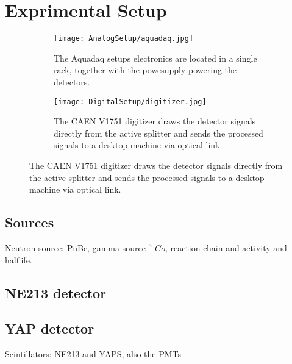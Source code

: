 \documentclass[main.tex]{subfiles}
\begin{document}
\section{Exprimental Setup}
\begin{figure}[ht]
	\begin{subfigure}[b]{0.4\textwidth}
	    \centering
    	    \texttt{[image: AnalogSetup/aquadaq.jpg]}
        	\caption{The Aquadaq setups electronics are located in a single rack, together with the powesupply powering the detectors.}
	    \label{fig:aquadaq_image} 
	\end{subfigure}
	\begin{subfigure}[b]{0.4\textwidth}
    	\centering
        	\texttt{[image: DigitalSetup/digitizer.jpg]}
        	\caption{The CAEN V1751 digitizer draws the detector signals directly from the active splitter and sends the processed signals to a desktop machine via optical link.}
    	\label{fig:aquadaq_image} 
    \end{subfigure}
\end{figure}

\subsection{Sources}
Neutron source: PuBe, gamma source $^{60}Co$, reaction chain and activity and halflife.



\subsection{NE213 detector}
\subsection{YAP detector}
Scintillators: NE213 and YAPS, also the PMTs
\end{document}
